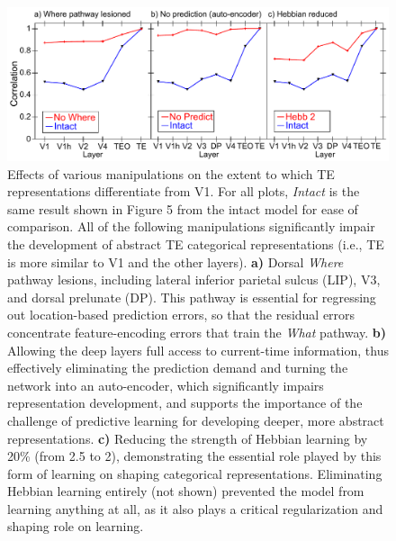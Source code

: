 \documentclass[11pt,twoside]{article}
\newif\myifpdf
\begin{document}
\begin{figure}
  \centering\includegraphics[width=5in]{fig_08} %
  \caption{Effects of various manipulations on the extent to which TE representations differentiate from V1.  For all plots, \emph{Intact} is the same result shown in Figure 5 from the intact model for ease of comparison.  All of the following  manipulations significantly impair the development of abstract TE categorical representations (i.e., TE is more similar to V1 and the other layers).  {\bf a)} Dorsal \emph{Where} pathway lesions, including lateral inferior parietal sulcus (LIP), V3, and dorsal prelunate (DP).  This pathway is essential for regressing out location-based prediction errors, so that the residual errors concentrate feature-encoding errors that train the \emph{What} pathway.  {\bf b)} Allowing the deep layers full access to current-time information, thus effectively eliminating the prediction demand and turning the network into an auto-encoder, which significantly impairs representation development, and supports the importance of the challenge of predictive learning for developing deeper, more abstract representations.  {\bf c)} Reducing the strength of Hebbian learning by 20\% (from 2.5 to 2), demonstrating the essential role played by this form of learning on shaping categorical representations.  Eliminating Hebbian learning entirely (not shown) prevented the model from learning anything at all, as it also plays a critical regularization and shaping role on learning.}
  \label{fig.manips}
\end{figure}
\end{document}
